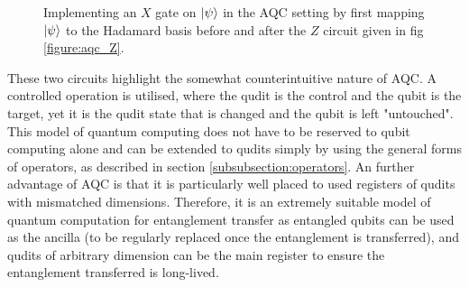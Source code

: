 \begin{figure}[h]
    \begin{center}
    \caption{Implementing an $X$ gate on $\ket{\psi}$ in the AQC setting by first mapping $\ket{\psi}$ to the Hadamard basis before and after the $Z$ circuit given in fig \ref{figure:aqc_Z}.}
    \label{figure:aqc_X}
    \end{center}
\end{figure}
These two circuits highlight the somewhat counterintuitive nature of AQC.
A controlled operation is utilised, where the qudit is the control and the qubit is the target, yet it is the qudit state that is changed and the qubit is left "untouched".\newline
This model of quantum computing does not have to be reserved to qubit computing alone and can be extended to qudits simply by using the general forms of operators, as described in section \ref{subsubsection:operators}.
An further advantage of AQC is that it is particularly well placed to used registers of qudits with mismatched dimensions.
Therefore, it is an extremely suitable model of quantum computation for entanglement transfer as entangled qubits can be used as the ancilla (to be regularly replaced once the entanglement is transferred), and qudits of arbitrary dimension can be the main register to ensure the entanglement transferred is long-lived.
